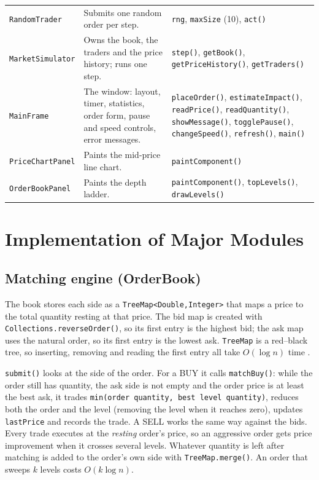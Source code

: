 \documentclass[12pt,a4paper,openany,oneside]{report}
\newcommand{\code}[1]{\texttt{#1}}
\begin{document}
\begin{longtable}{@{}L{3.3cm} L{5.0cm} L{6.3cm}@{}}
\code{RandomTrader} & Submits one random order per step. & \code{rng}, \code{maxSize} (10), \code{act()}\\
\code{MarketSimulator} & Owns the book, the traders and the price history; runs one step. & \code{step()}, \code{getBook()}, \code{getPriceHistory()}, \code{getTraders()}\\
\code{MainFrame} & The window: layout, timer, statistics, order form, pause and speed controls, error messages. & \code{placeOrder()}, \code{estimateImpact()}, \code{readPrice()}, \code{readQuantity()}, \code{showMessage()}, \code{togglePause()}, \code{changeSpeed()}, \code{refresh()}, \code{main()}\\
\code{PriceChartPanel} & Paints the mid-price line chart. & \code{paintComponent()}\\
\code{OrderBookPanel} & Paints the depth ladder. & \code{paintComponent()}, \code{topLevels()}, \code{drawLevels()}\\
\end{longtable}

\section{Implementation of Major Modules}

\subsection{Matching engine (OrderBook)}

The book stores each side as a \code{TreeMap<Double,Integer>} that maps a price to the total quantity resting at that price. The bid map is created with \code{Collections.reverseOrder()}, so its first entry is the highest bid; the ask map uses the natural order, so its first entry is the lowest ask. \code{TreeMap} is a red--black tree, so inserting, removing and reading the first entry all take $O(\log n)$ time \cite{treemapapi,clrs}.

\code{submit()} looks at the side of the order. For a BUY it calls \code{matchBuy()}: while the order still has quantity, the ask side is not empty and the order price is at least the best ask, it trades \code{min(order quantity, best level quantity)}, reduces both the order and the level (removing the level when it reaches zero), updates \code{lastPrice} and records the trade. A SELL works the same way against the bids. Every trade executes at the \emph{resting} order's price, so an aggressive order gets price improvement when it crosses several levels. Whatever quantity is left after matching is added to the order's own side with \code{TreeMap.merge()}. An order that sweeps $k$ levels costs $O(k\log n)$.
\end{document}
